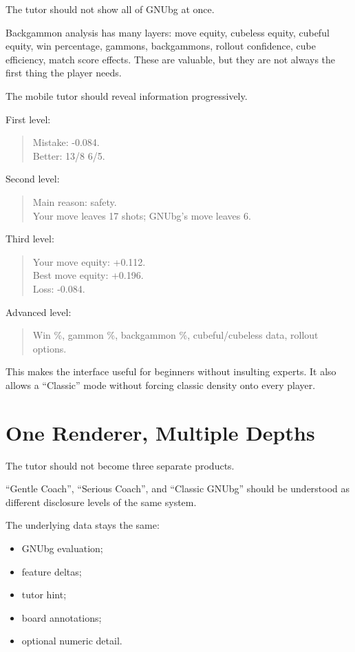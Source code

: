 \documentclass[11pt,a4paper]{article}
\begin{document}
The tutor should not show all of GNUbg at once.

Backgammon analysis has many layers: move equity, cubeless equity, cubeful equity, win percentage, gammons, backgammons, rollout confidence, cube efficiency, match score effects. These are valuable, but they are not always the first thing the player needs.

The mobile tutor should reveal information progressively.

First level:

\begin{quote}
Mistake: -0.084.\\
Better: 13/8 6/5.
\end{quote}

Second level:

\begin{quote}
Main reason: safety.\\
Your move leaves 17 shots; GNUbg's move leaves 6.
\end{quote}

Third level:

\begin{quote}
Your move equity: +0.112.\\
Best move equity: +0.196.\\
Loss: -0.084.
\end{quote}

Advanced level:

\begin{quote}
Win \%, gammon \%, backgammon \%, cubeful/cubeless data, rollout options.
\end{quote}

This makes the interface useful for beginners without insulting experts. It also allows a ``Classic'' mode without forcing classic density onto every player.

\section{One Renderer, Multiple Depths}

The tutor should not become three separate products.

``Gentle Coach'', ``Serious Coach'', and ``Classic GNUbg'' should be understood as different disclosure levels of the same system.

The underlying data stays the same:

\begin{itemize}
  \item GNUbg evaluation;
  \item feature deltas;
  \item tutor hint;
  \item board annotations;
  \item optional numeric detail.
\end{itemize}
\end{document}

